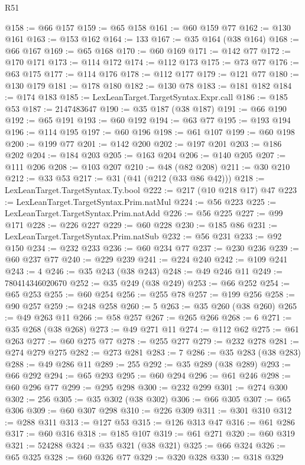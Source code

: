 \begin{lexlean}{R51}
\begin{coremodule}
@158 := @66 @157
@159 := @65 @158
@161 := @60 @159 @77
@162 := @130 @161
@163 := @153 @162
@164 := 133
@167 := @35 @164 (@38 @164)
@168 := @66 @167
@169 := @65 @168
@170 := @60 @169
@171 := @142 @77
@172 := @170 @171
@173 := @114 @172
@174 := @112 @173
@175 := @73 @77
@176 := @63 @175
@177 := @114 @176
@178 := @112 @177
@179 := @121 @77
@180 := @130 @179
@181 := @178 @180
@182 := @130 @78
@183 := @181 @182
@184 := @174 @183
@185 := LexLeanTarget.TargetSyntax.Expr.call
@186 := @185 @53
@187 := 2147483647
@190 := @35 @187 (@38 @187)
@191 := @66 @190
@192 := @65 @191
@193 := @60 @192
@194 := @63 @77
@195 := @193 @194
@196 := @114 @195
@197 := @60 @196
@198 := @61 @107
@199 := @60 @198
@200 := @199 @77
@201 := @142 @200
@202 := @197 @201
@203 := @186 @202
@204 := @184 @203
@205 := @163 @204
@206 := @140 @205
@207 := @111 @206
@208 := @103 @207
@210 := @48 (@82 @208)
@211 := @30 @210
@212 := @33 @53
@217 := @31 (@41 (@212 (@33 @86 @42)))
@218 := LexLeanTarget.TargetSyntax.Ty.bool
@222 := @217 (@10 @218 @17) @47
@223 := LexLeanTarget.TargetSyntax.Prim.natMul
@224 := @56 @223
@225 := LexLeanTarget.TargetSyntax.Prim.natAdd
@226 := @56 @225
@227 := @99 @171
@228 := @226 @227
@229 := @60 @228
@230 := @185 @86
@231 := LexLeanTarget.TargetSyntax.Prim.natSub
@232 := @56 @231
@233 := @92 @150
@234 := @232 @233
@236 := @60 @234 @77
@237 := @230 @236
@239 := @60 @237 @77
@240 := @229 @239
@241 := @224 @240
@242 := @109 @241
@243 := 4
@246 := @35 @243 (@38 @243)
@248 := @49 @246 @11
@249 := 780414346020670
@252 := @35 @249 (@38 @249)
@253 := @66 @252
@254 := @65 @253
@255 := @60 @254
@256 := @255 @78
@257 := @199 @256
@258 := @90 @257
@259 := @248 @258
@260 := 5
@263 := @35 @260 (@38 @260)
@265 := @49 @263 @11
@266 := @58 @257
@267 := @265 @266
@268 := 6
@271 := @35 @268 (@38 @268)
@273 := @49 @271 @11
@274 := @112 @62
@275 := @61 @263
@277 := @60 @275 @77
@278 := @255 @277
@279 := @232 @278
@281 := @274 @279 @275
@282 := @273 @281
@283 := 7
@286 := @35 @283 (@38 @283)
@288 := @49 @286 @11
@289 := 255
@292 := @35 @289 (@38 @289)
@293 := @66 @292
@294 := @65 @293
@295 := @60 @294
@296 := @61 @246
@298 := @60 @296 @77
@299 := @295 @298
@300 := @232 @299
@301 := @274 @300
@302 := 256
@305 := @35 @302 (@38 @302)
@306 := @66 @305
@307 := @65 @306
@309 := @60 @307 @298
@310 := @226 @309
@311 := @301 @310
@312 := @288 @311
@313 := @127 @53
@315 := @126 @313 @47
@316 := @61 @286
@317 := @60 @316
@318 := @185 @107
@319 := @61 @271
@320 := @60 @319
@321 := 524288
@324 := @35 @321 (@38 @321)
@325 := @66 @324
@326 := @65 @325
@328 := @60 @326 @77
@329 := @320 @328
@330 := @318 @329

\end{coremodule}
\end{lexlean}
